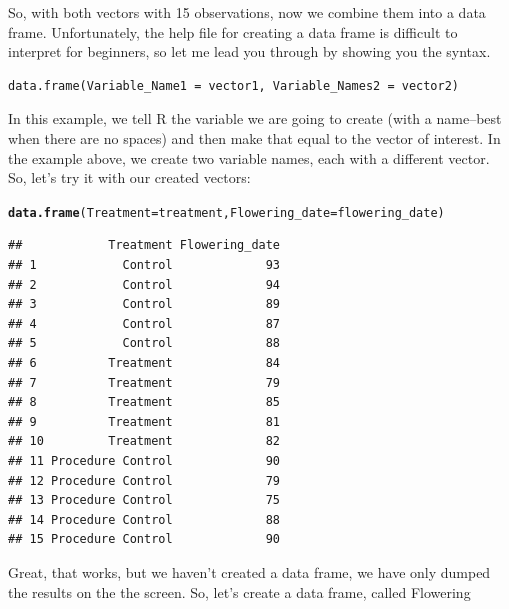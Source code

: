\documentclass{tufte-handout}\usepackage[]{graphicx}\usepackage[]{color}
\makeatletter
\newcommand{\hlstd}[1]{\textcolor[rgb]{0.345,0.345,0.345}{#1}}%
\newcommand{\hlkwc}[1]{\textcolor[rgb]{0.333,0.667,0.333}{#1}}%
\newcommand{\hlkwd}[1]{\textcolor[rgb]{0.737,0.353,0.396}{\textbf{#1}}}%
\newenvironment{kframe}{%
 \def\at@end@of@kframe{}%
 \ifinner\ifhmode%
  \def\at@end@of@kframe{\end{minipage}}%
  \begin{minipage}{\columnwidth}%
 \fi\fi%
 \def\FrameCommand##1{\hskip\@totalleftmargin \hskip-\fboxsep
 \colorbox{shadecolor}{##1}\hskip-\fboxsep
     \hskip-\linewidth \hskip-\@totalleftmargin \hskip\columnwidth}%
 \MakeFramed {\advance\hsize-\width
   \@totalleftmargin\z@ \linewidth\hsize
   \@setminipage}}%
 {\par\unskip\endMakeFramed%
 \at@end@of@kframe}
\newenvironment{knitrout}{}{} %
\makeatother
\begin{document}
So, with both vectors with 15 observations, now we combine them into a data frame. Unfortunately, the help file for creating a data frame is difficult to interpret for beginners, so let me lead you through by showing you the syntax.

\begin{fullwidth}
\begin{verbatim}
data.frame(Variable_Name1 = vector1, Variable_Names2 = vector2)
\end{verbatim}
\end{fullwidth}
\medskip

In this example, we tell R the variable we are going to create (with a name--best when there are no spaces) and then make that equal to the vector of interest. In the example above, we create two variable names, each with a different vector.  So, let's try it with our created vectors:



\begin{knitrout}
\color{fgcolor}\begin{kframe}
\begin{alltt}
\hlkwd{data.frame}\hlstd{(}\hlkwc{Treatment} \hlstd{= treatment,} \hlkwc{Flowering_date} \hlstd{= flowering_date)}
\end{alltt}
\begin{verbatim}
##            Treatment Flowering_date
## 1            Control             93
## 2            Control             94
## 3            Control             89
## 4            Control             87
## 5            Control             88
## 6          Treatment             84
## 7          Treatment             79
## 8          Treatment             85
## 9          Treatment             81
## 10         Treatment             82
## 11 Procedure Control             90
## 12 Procedure Control             79
## 13 Procedure Control             75
## 14 Procedure Control             88
## 15 Procedure Control             90
\end{verbatim}
\end{kframe}
\end{knitrout}

Great, that works, but we haven't created a data frame, we have only dumped the results on the the screen. So, let's create a data frame, called Flowering
\end{document}
